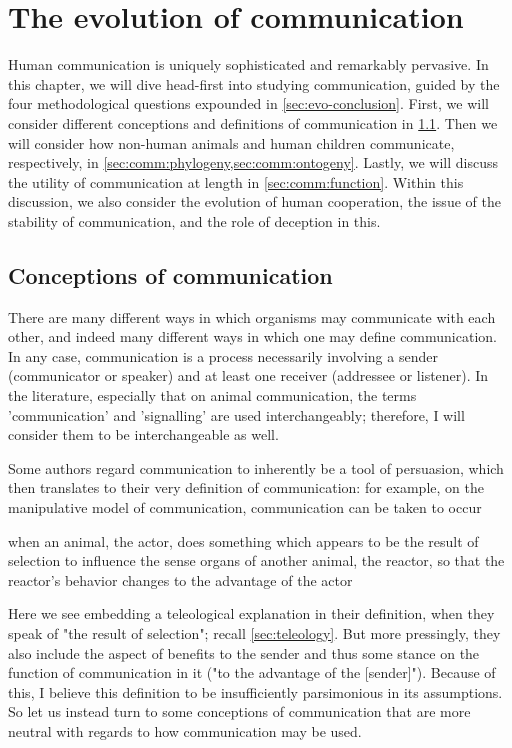 \chapter{The evolution of communication}
\label{ch:communication}

Human communication is uniquely sophisticated and remarkably pervasive.
In this chapter, we will dive head-first into studying communication, guided by the four methodological questions expounded in \cref{sec:evo-conclusion}.
First, we will consider different conceptions and definitions of communication in \cref{sec:comm:definition}. Then we will consider how non-human animals and human children communicate, respectively, in \cref{sec:comm:phylogeny,sec:comm:ontogeny}. Lastly, we will discuss the utility of communication at length in \cref{sec:comm:function}. Within this discussion, we also consider the evolution of human cooperation, the issue of the stability of communication, and the role of deception in this.

\section{Conceptions of communication}
\label{sec:comm:definition}

There are many different ways in which organisms may communicate with each other, and indeed many different ways in which one may define communication. In any case, communication is a process necessarily involving a sender (communicator or speaker) and at least one receiver (addressee or listener). In the literature, especially that on animal communication, the terms 'communication' and 'signalling' are used interchangeably; therefore, I will consider them to be interchangeable as well.

Some authors regard communication to inherently be a tool of persuasion, which then translates to their very definition of communication: for example, on the manipulative model of communication, communication can be taken to occur
\begin{quoting}
    when an animal, the actor, does something which appears to be the result of selection to influence the sense organs of another animal, the reactor, so that the reactor's behavior changes to the advantage of the actor
    \hfill \citep[p.~283]{DawkinsKrebs78}
\end{quoting}
Here we see \citeauthor{DawkinsKrebs78} embedding a teleological explanation in their definition, when they speak of "the result of selection"; recall \cref{sec:teleology}.
But more pressingly, they also include the aspect of benefits to the sender and thus some stance on the function of communication in it ("to the advantage of the [sender]").
Because of this, I believe this definition to be insufficiently parsimonious in its assumptions. So let us instead turn to some conceptions of communication that are more neutral with regards to how communication may be used.

